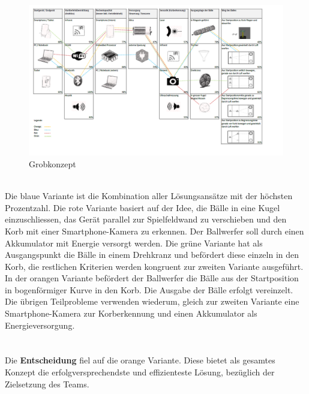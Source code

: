 \\
\newpage
\begin{figure}[h!]
	\centering
	\includegraphics[width=1\textwidth]{Enddokumentation/Varianten/Bilder/Grobkonzept.png}
	\caption{Grobkonzept}
	\label{fig:Grobkonzept}
\end{figure}

\\
Die blaue Variante ist die Kombination aller Lösungsansätze mit der höchsten Prozentzahl. Die rote Variante basiert auf der Idee, die Bälle in eine Kugel einzuschliessen, das Gerät parallel zur Spielfeldwand zu verschieben und den Korb mit einer Smartphone-Kamera zu erkennen. Der Ballwerfer soll durch einen Akkumulator mit Energie versorgt werden. Die grüne Variante hat als Ausgangspunkt die Bälle in einem Drehkranz und befördert diese einzeln in den Korb, die restlichen Kriterien werden kongruent zur zweiten Variante ausgeführt. In der orangen Variante befördert der Ballwerfer die Bälle aus der Startposition in bogenförmiger Kurve in den Korb. Die Ausgabe der Bälle erfolgt vereinzelt. Die übrigen Teilprobleme verwenden wiederum, gleich zur zweiten Variante eine Smartphone-Kamera zur Korberkennung und einen Akkumulator als Energieversorgung.\\
\\\\
Die \textbf{Entscheidung} fiel auf die orange Variante. Diese bietet als gesamtes Konzept die erfolgversprechendste und effizienteste Lösung, bezüglich der Zielsetzung des Teams. \\

